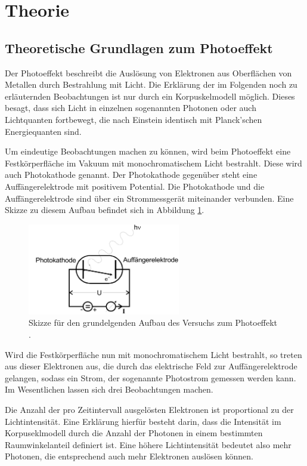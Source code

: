 \section{Theorie}
\label{sec:Theorie}

\subsection{Theoretische Grundlagen zum Photoeffekt}
\label{subsec:Theorie_Photoeffekt}

Der Photoeffekt beschreibt die Auslösung von Elektronen aus Oberflächen von Metallen
durch Bestrahlung mit Licht. Die Erklärung der im Folgenden noch zu erläuternden
Beobachtungen ist nur durch ein Korpuskelmodell möglich. Dieses besagt, dass sich
Licht in einzelnen sogenannten Photonen oder auch Lichtquanten fortbewegt, die nach
Einstein identisch mit Planck'schen Energiequanten sind.

Um eindeutige Beobachtungen machen zu können, wird beim Photoeffekt eine Festkörperfläche
im Vakuum mit monochromatischem Licht bestrahlt. Diese wird auch Photokathode genannt.
Der Photokathode gegenüber steht eine Auffängerelektrode mit positivem Potential.
Die Photokathode und die Auffängerelektrode sind über ein Strommessgerät miteinander verbunden.
Eine Skizze zu diesem Aufbau befindet sich in Abbildung \ref{fig:photoeffekt_skizze}.

\begin{figure}
  \centering
  \includegraphics[height=4cm]{data/photoeffekt_skizze.png}
  \caption{Skizze für den grundelgenden Aufbau des Versuchs zum Photoeffekt \cite{Versuchsanleitung}.}
  \label{fig:photoeffekt_skizze}
\end{figure}

Wird die Festkörperfläche nun mit monochromatischem Licht bestrahlt, so treten aus dieser
Elektronen aus, die durch das elektrische Feld zur Auffängerelektrode gelangen, sodass
ein Strom, der sogenannte Photostrom gemessen werden kann. Im Wesentlichen lassen
sich drei Beobachtungen machen.

Die Anzahl der pro Zeitintervall ausgelösten Elektronen ist proportional zu der
Lichtintensität. Eine Erklärung hierfür besteht darin, dass die Intensität im Korpuseklmodell
durch die Anzahl der Photonen in einem bestimmten Raumwinkelanteil definiert ist.
Eine höhere Lichtintensität bedeutet also mehr Photonen, die entsprechend auch mehr
Elektronen auslösen können.

